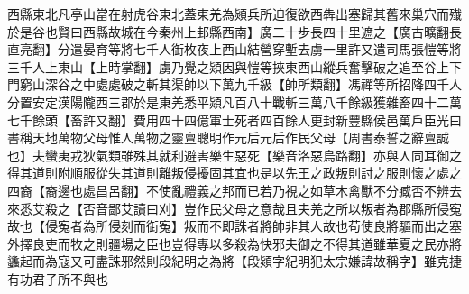 西縣東北凡亭山當在射虎谷東北蓋東羌為熲兵所迫復欲西犇出塞歸其舊來巢穴而殱於是谷也賢曰西縣故城在今秦州上邽縣西南】廣二十步長四十里遮之【廣古曠翻長直亮翻】分遣晏育等將七千人衘枚夜上西山結營穿塹去虜一里許又遣司馬張愷等將三千人上東山【上時掌翻】虜乃覺之熲因與愷等挾東西山縱兵奮擊破之追至谷上下門窮山深谷之中處處破之斬其渠帥以下萬九千級【帥所類翻】馮禪等所招降四千人分置安定漢陽隴西三郡於是東羌悉平熲凡百八十戰斬三萬八千餘級獲雜畜四十二萬七千餘頭【畜許又翻】費用四十四億軍士死者四百餘人更封新豐縣侯邑萬戶臣光曰書稱天地萬物父母惟人萬物之靈亶聰明作元后元后作民父母【周書泰誓之辭亶誠也】夫蠻夷戎狄氣類雖殊其就利避害樂生惡死【樂音洛惡烏路翻】亦與人同耳御之得其道則附順服從失其道則離叛侵擾固其宜也是以先王之政叛則討之服則懷之處之四裔【裔邊也處昌呂翻】不使亂禮義之邦而已若乃視之如草木禽獸不分臧否不辨去來悉艾殺之【否音鄙艾讀曰刈】豈作民父母之意哉且夫羌之所以叛者為郡縣所侵寃故也【侵寃者為所侵刻而衘寃】叛而不即誅者將帥非其人故也苟使良將驅而出之塞外擇良吏而牧之則疆場之臣也豈得專以多殺為快邪夫御之不得其道雖華夏之民亦將蠭起而為寇又可盡誅邪然則段紀明之為將【段熲字紀明犯太宗嫌諱故稱字】雖克捷有功君子所不與也


